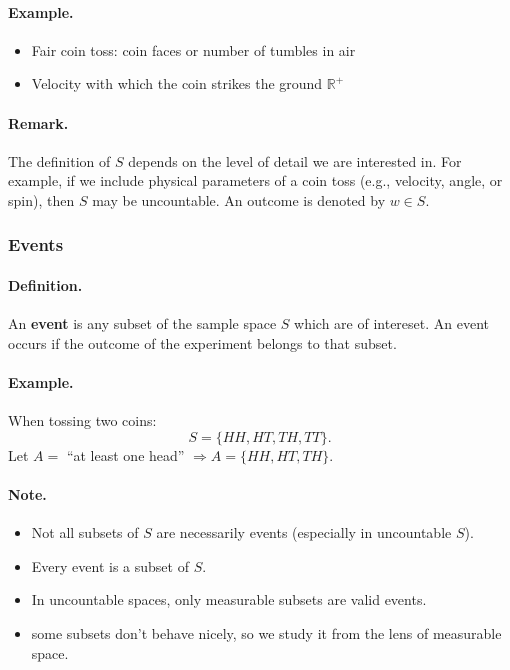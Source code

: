 \paragraph{Example.}
\begin{itemize}
    \item Fair coin toss: coin faces or number of tumbles in air
    \item Velocity with which the coin strikes the ground $\mathbb{R}^+$
\end{itemize}

\paragraph{Remark.}
The definition of $S$ depends on the level of detail we are interested in.
For example, if we include physical parameters of a coin toss (e.g., velocity, angle, or spin), then $S$ may be uncountable. An outcome is denoted by $w \in S$.

\begin{center}
\end{center}



\subsubsection{Events}

\paragraph{Definition.}
An \textbf{event} is any subset of the sample space $S$ which are of intereset.  
An event occurs if the outcome of the experiment belongs to that subset.

\paragraph{Example.}
When tossing two coins:
\[
S = \{HH, HT, TH, TT\}.
\]
Let $A =$ ``at least one head'' $\Rightarrow A = \{HH, HT, TH\}$.

\paragraph{Note.}
\begin{itemize}
    \item Not all subsets of $S$ are necessarily events (especially in uncountable $S$).
    \item Every event is a subset of $S$.
    \item In uncountable spaces, only measurable subsets are valid events.
    \item some subsets don't behave nicely, so we study it from the lens of measurable space.
\end{itemize}


